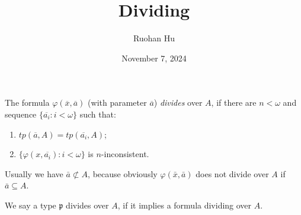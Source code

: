 \documentclass[a4paper]{article}
\title{Dividing}
\date{November 7, 2024}
\author{Ruohan Hu}
\begin{document}
\maketitle
\par{
The formula \(\varphi ( \overline {x}, \overline {a})\) (with parameter \(\overline {a}\)) \emph{divides} over \(A\), if there are \(n< \omega\) and sequence \(\{ \overline {a_i}:i< \omega \}\) such that:
\begin{enumerate}
\item{\(tp( \overline {a},A)=tp( \overline {a_i},A)\);}
    \item{\(\{ \varphi (x, \overline {a_i}):i< \omega \}\) is \(n\)-inconsistent.}
\end{enumerate}
Usually we have \(\bar {a} \not \subset  A\), because obviously \(\varphi ( \bar {x}, \bar {a})\) does not divide over \(A\) if \(\bar {a} \subseteq  A\).

We say a type \(\mathfrak {p}\) divides over \(A\), if it implies a formula dividing over \(A\).
}
\printbibliography
\end{document}
